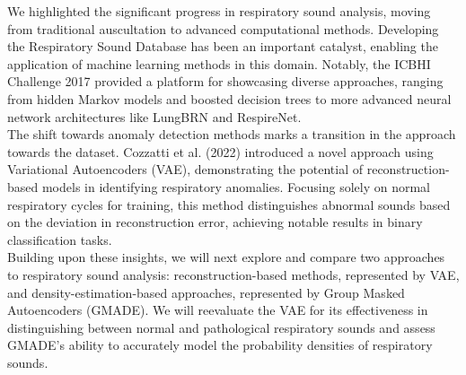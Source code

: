 We highlighted the significant progress in respiratory sound analysis, moving from traditional auscultation to advanced computational methods. Developing the Respiratory Sound Database has been an important catalyst, enabling the application of machine learning methods in this domain. Notably, the ICBHI Challenge 2017 provided a platform for showcasing diverse approaches, ranging from hidden Markov models and boosted decision trees to more advanced neural network architectures like LungBRN and RespireNet.\\
The shift towards anomaly detection methods marks a transition in the approach towards the dataset. Cozzatti et al. (2022) introduced a novel approach using Variational Autoencoders (VAE), demonstrating the potential of reconstruction-based models in identifying respiratory anomalies. Focusing solely on normal respiratory cycles for training, this method distinguishes abnormal sounds based on the deviation in reconstruction error, achieving notable results in binary classification tasks.\\
Building upon these insights, we will next explore and compare two approaches to respiratory sound analysis: reconstruction-based methods, represented by VAE, and density-estimation-based approaches, represented by Group Masked Autoencoders (GMADE). We will reevaluate the VAE for its effectiveness in distinguishing between normal and pathological respiratory sounds and assess GMADE's ability to accurately model the probability densities of respiratory sounds.

